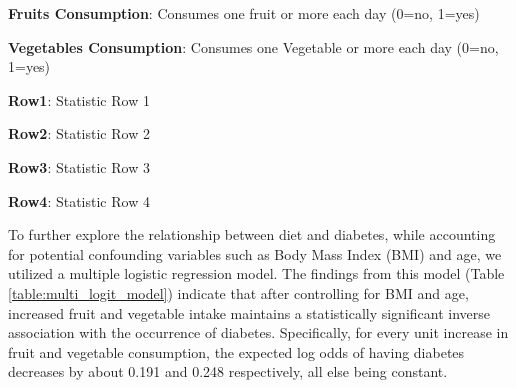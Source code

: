 \documentclass[11pt]{article}
\begin{document}
\begin{table}[h]
\caption{Diabetes prevalence in relation to fruit and vegetable consumption.}
\label{table:diabetes_fruit_veggie}
\begin{threeparttable}
\renewcommand{\TPTminimum}{\linewidth}
\begin{tablenotes}
\footnotesize
\item \textbf{Fruits Consumption}: Consumes one fruit or more each day (0=no, 1=yes)
\item \textbf{Vegetables Consumption}: Consumes one Vegetable or more each day (0=no, 1=yes)
\item \textbf{Row1}: Statistic Row 1
\item \textbf{Row2}: Statistic Row 2
\item \textbf{Row3}: Statistic Row 3
\item \textbf{Row4}: Statistic Row 4
\end{tablenotes}
\end{threeparttable}
\end{table}


To further explore the relationship between diet and diabetes, while accounting for potential confounding variables such as Body Mass Index (BMI) and age, we utilized a multiple logistic regression model. The findings from this model (Table \ref{table:multi_logit_model}) indicate that after controlling for BMI and age, increased fruit and vegetable intake maintains a statistically significant inverse association with the occurrence of diabetes. Specifically, for every unit increase in fruit and vegetable consumption, the expected log odds of having diabetes decreases by about 0.191 and 0.248 respectively, all else being constant.
\end{document}
